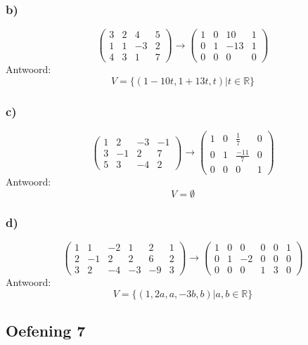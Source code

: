 \documentclass[lineaire_algebra_oplossingen.tex]{subfiles}
\begin{document}
\subsubsection*{b)}
\[
\begin{pmatrix}
3 &  2 &  4 &  5\\
1 &  1 & -3 &  2\\
4 &  3 &  1 &  7
\end{pmatrix}
\longrightarrow
\begin{pmatrix}
1 &  0 & 10 &  1\\
0 &  1 & -13&  1\\
0 &  0 &  0 &  0
\end{pmatrix}
\]
Antwoord:
\[
V=\{(1-10t,1+13t,t) | t \in \mathbb{R}\}
\]

\subsubsection*{c)}
\[
\begin{pmatrix}
1 &  2 & -3 & -1\\
3 & -1 &  2 &  7\\
5 &  3 & -4 &  2
\end{pmatrix}
\longrightarrow
\begin{pmatrix}
1 &  0 & \frac{1}{7} &  0\\
0 &  1 & \frac{-11}{7}&  0\\
0 &  0 &  0 &  1
\end{pmatrix}
\]
Antwoord:
\[
V=\emptyset
\]

\subsubsection*{d)}
\[
\begin{pmatrix}
1 &  1 & -2 &  1 &  2 & 1\\
2 & -1 &  2 &  2 &  6 & 2\\
3 &  2 & -4 & -3 & -9 & 3
\end{pmatrix}
\longrightarrow
\begin{pmatrix}
1 &  0 &  0 &  0 &  0 & 1\\
0 &  1 & -2 &  0 &  0 & 0\\
0 &  0 &  0 &  1 &  3 & 0
\end{pmatrix}
\]
Antwoord:
\[
V=\{(1,2a,a,-3b,b) | a,b \in \mathbb{R} \}
\]

\subsection{Oefening 7}
\end{document}
